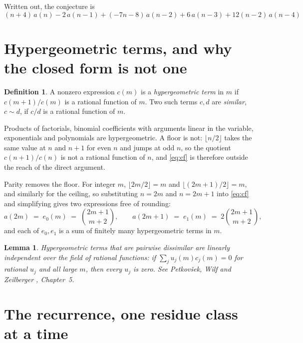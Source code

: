 \documentclass[11pt,a4paper]{article}
\theoremstyle{plain}
\newtheorem{lemma}[theorem]{Lemma}
\theoremstyle{definition}
\newtheorem{definition}[theorem]{Definition}
\begin{document}
Written out, the conjecture is
\begin{equation}\label{eq:conj}
(n + 4)\,a(n) - 2\,a(n-1) + (- 7 n - 8)\,a(n-2) + 6\,a(n-3) + 12 \left(n - 2\right)\,a(n-4)
\end{equation}

\section{Hypergeometric terms, and why the closed form is not one}

\begin{definition}
A nonzero expression $c(m)$ is a \emph{hypergeometric term} in $m$ if $c(m+1)/c(m)$ is a
rational function of $m$. Two such terms $c,d$ are \emph{similar}, $c\sim d$, if $c/d$ is a
rational function of $m$.
\end{definition}

Products of factorials, binomial coefficients with arguments linear in the variable,
exponentials and polynomials are hypergeometric. A floor is not: $\lfloor n/2\rfloor$ takes
the same value at $n$ and $n+1$ for even $n$ and jumps at odd $n$, so the quotient
$c(n+1)/c(n)$ is not a rational function of $n$, and \eqref{eq:cf} is therefore outside the
reach of the direct argument.

Parity removes the floor. For integer $m$,
$\lfloor 2m/2\rfloor=m$ and $\lfloor (2m+1)/2\rfloor=m$, and similarly for the ceiling, so
substituting $n=2m$ and $n=2m+1$ into \eqref{eq:cf} and simplifying gives two expressions
free of rounding:
\begin{equation}\label{eq:halves}
a(2m)\;=\;e_{0}(m)\;=\;{\binom{2 m + 1}{m + 2}},
\qquad
a(2m+1)\;=\;e_{1}(m)\;=\;2 {\binom{2 m + 1}{m + 2}},
\end{equation}
and each of $e_{0},e_{1}$ is a sum of finitely many hypergeometric terms in $m$.

\begin{lemma}\label{lem:indep}
Hypergeometric terms that are pairwise dissimilar are linearly independent over the field
of rational functions: if $\sum_{j}u_{j}(m)c_{j}(m)=0$ for rational $u_{j}$ and all large
$m$, then every $u_{j}$ is zero. See Petkov\v{s}ek, Wilf and Zeilberger \cite{AB},
Chapter~5.
\end{lemma}

\section{The recurrence, one residue class at a time}
\end{document}
